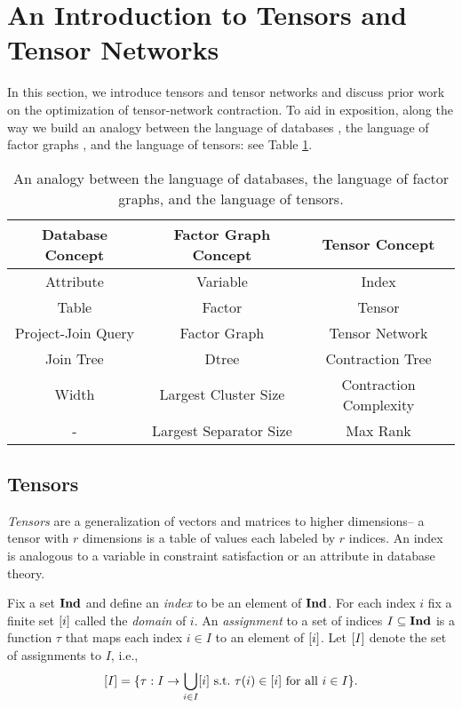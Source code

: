 \section{An Introduction to Tensors and Tensor Networks}
\label{sec:tensors:tensors}
In this section, we introduce tensors and tensor networks and discuss prior work on the optimization of tensor-network contraction. To aid in exposition, along the way we build an analogy between the language of databases \cite{SG88}, the language of factor graphs \cite{KFL01,dechter99,darwiche01b}, and the language of tensors: see Table \ref{table:db-tensor-analogy}.

\begin{table}[t]
\centering
\begin{tabular}{c|c|c}
\hline
\textbf{Database Concept} & \textbf{Factor Graph Concept} & \textbf{Tensor Concept}\\ \hline
Attribute & Variable & Index\\
Table & Factor & Tensor\\
Project-Join Query & Factor Graph & Tensor Network\\
Join Tree & Dtree & Contraction Tree\\ 
Width & Largest Cluster Size & Contraction Complexity \\
- & Largest Separator Size & Max Rank \\ \hline
\end{tabular}
\caption{\label{table:db-tensor-analogy} An analogy between the language of databases, the language of factor graphs, and the language of tensors.}
\end{table}

\subsection{Tensors}
\emph{Tensors} are a generalization of vectors and matrices to higher dimensions-- a tensor with $r$ dimensions is a table of values each labeled by $r$ indices. An index is analogous to a variable in constraint satisfaction or an attribute in database theory. 

Fix a set $\mathbf{Ind}$ and define an \emph{index} to be an element of $\mathbf{Ind}$. For each index $i$ fix a finite set $[i]$ called the \emph{domain} of $i$. An \emph{assignment} to a set of indices $I \subseteq \mathbf{Ind}$ is a function $\tau$ that maps each index $i \in I$ to an element of $[i]$. Let $[I]$ denote the set of assignments to $I$, i.e., $$[I] = \{\tau: I \rightarrow \bigcup_{i \in I} [i]~\text{s.t.}~\tau(i) \in [i]~\text{for all}~i \in I\}.$$

